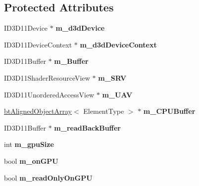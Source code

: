 \subsection*{Protected Attributes}
\begin{DoxyCompactItemize}
\item 
\mbox{\label{classbtDX11Buffer_a35263d0d4776e9cb5b57d8da3d593579}} 
I\+D3\+D11\+Device $\ast$ {\bfseries m\+\_\+d3d\+Device}
\item 
\mbox{\label{classbtDX11Buffer_a4e2d7008154329405fa7295d3daac674}} 
I\+D3\+D11\+Device\+Context $\ast$ {\bfseries m\+\_\+d3d\+Device\+Context}
\item 
\mbox{\label{classbtDX11Buffer_ad9399837f81a81edd8dd3fa2c25afb8e}} 
I\+D3\+D11\+Buffer $\ast$ {\bfseries m\+\_\+\+Buffer}
\item 
\mbox{\label{classbtDX11Buffer_abe272ca93c728b10c4877a44e61216ff}} 
I\+D3\+D11\+Shader\+Resource\+View $\ast$ {\bfseries m\+\_\+\+S\+RV}
\item 
\mbox{\label{classbtDX11Buffer_a6b418e954ccff6c33755d723f0e4cb6d}} 
I\+D3\+D11\+Unordered\+Access\+View $\ast$ {\bfseries m\+\_\+\+U\+AV}
\item 
\mbox{\label{classbtDX11Buffer_a5d1dca9888c34622ef9d5e4049859da6}} 
\hyperlink{classbtAlignedObjectArray}{bt\+Aligned\+Object\+Array}$<$ Element\+Type $>$ $\ast$ {\bfseries m\+\_\+\+C\+P\+U\+Buffer}
\item 
\mbox{\label{classbtDX11Buffer_af5dd18a63c504c4d78db0b1108304539}} 
I\+D3\+D11\+Buffer $\ast$ {\bfseries m\+\_\+read\+Back\+Buffer}
\item 
\mbox{\label{classbtDX11Buffer_ac418450a45af67e2b8a9870ae9e9d56a}} 
int {\bfseries m\+\_\+gpu\+Size}
\item 
\mbox{\label{classbtDX11Buffer_afaf10235a7b9ecebeeddab3148e42eba}} 
bool {\bfseries m\+\_\+on\+G\+PU}
\item 
\mbox{\label{classbtDX11Buffer_ab7902843a6db8d28c325860a553b6ffd}} 
bool {\bfseries m\+\_\+read\+Only\+On\+G\+PU}
\end{DoxyCompactItemize}


